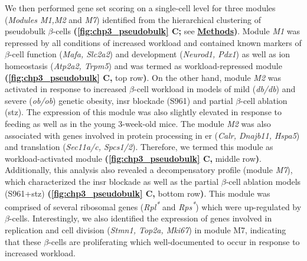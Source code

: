 \par We then performed gene set scoring on a single-cell level for three modules (\textit{Modules M1,M2} and \textit{M7}) identified from the hierarchical clustering of pseudobulk $\beta$-cells \textbf{(\autoref{fig:chp3_pseudobulk} C;} see \hyperref[subsubsec:met_chp3_scoring]{\textbf{Methods}}\textbf{)}. Module \textit{M1} was repressed by all conditions of increased workload and contained known markers of $\beta$-cell function (\textit{Mafa, Slc2a2}) and development (\textit{Neurod1, Pdx1}) as well as ion homeostasis (\textit{Atp2a2, Trpm5}) and was termed as workload-repressed module \textbf{(\autoref{fig:chp3_pseudobulk} C,} top row\textbf{)}. On the other hand, module \textit{M2} was activated in response to increased $\beta$-cell workload in models of mild (\textit{db/db}) and severe (\textit{ob/ob}) genetic obesity, \gls{insr} blockade (S961) and partial $\beta$-cell ablation (\gls{stz}). The expression of this module was also slightly elevated in response to feeding as well as in the young 3-week-old mice. The module \textit{M2} was also associated with genes involved in protein processing in \gls{er} (\textit{Calr, Dnajb11, Hspa5}) and translation (\textit{Sec11a/c, Spcs1/2}). Therefore, we termed this module as workload-activated module \textbf{(\autoref{fig:chp3_pseudobulk} C,} middle row\textbf{)}. Additionally, this analysis also revealed a decompensatory profile (module \textit{M7}), which characterized the \gls{insr} blockade as well as the partial $\beta$-cell ablation models (S961+\gls{stz}) \textbf{(\autoref{fig:chp3_pseudobulk} C,} bottom row\textbf{)}. This module was comprised of several ribosomal genes (\textit{Rpl\textsuperscript{*}} and \textit{Rps\textsuperscript{*}}) which were up-regulated by $\beta$-cells. Interestingly, we also identified the expression of genes involved in  replication and cell division (\textit{Stmn1, Top2a, Mki67}) in module M7, indicating that these $\beta$-cells are proliferating which well-documented to occur in response to increased workload.\\


